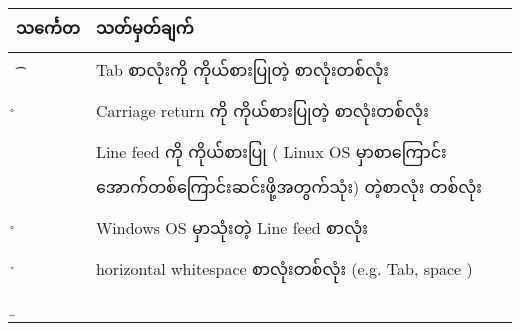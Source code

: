 \documentclass[11pt]{article}
\begin{document}
\begin{longtable}[c]{@{}ll@{}}
\toprule
\begin{minipage}[b]{0.17\columnwidth}\raggedright\strut
သင်္ကေတ
\strut\end{minipage} &
\begin{minipage}[b]{0.16\columnwidth}\raggedright\strut
သတ်မှတ်ချက်
\strut\end{minipage}\tabularnewline
\midrule
\endhead
\begin{minipage}[t]{0.17\columnwidth}\raggedright\strut
\t 
\strut\end{minipage} &
\begin{minipage}[t]{0.16\columnwidth}\raggedright\strut
Tab စာလုံးကို ကိုယ်စားပြုတဲ့ စာလုံးတစ်လုံး
\strut\end{minipage}\tabularnewline
\begin{minipage}[t]{0.17\columnwidth}\raggedright\strut
\r 
\strut\end{minipage} &
\begin{minipage}[t]{0.16\columnwidth}\raggedright\strut
Carriage return ကို ကိုယ်စားပြုတဲ့ စာလုံးတစ်လုံး
\strut\end{minipage}\tabularnewline
\begin{minipage}[t]{0.17\columnwidth}\raggedright\strut
\n 
\strut\end{minipage} &
\begin{minipage}[t]{0.16\columnwidth}\raggedright\strut
Line feed ကို ကိုယ်စားပြု ( Linux OS မှာစာကြောင်း
အောက်တစ်ကြောင်းဆင်းဖို့အတွက်သုံး) တဲ့စာလုံး တစ်လုံး
\strut\end{minipage}\tabularnewline
\begin{minipage}[t]{0.17\columnwidth}\raggedright\strut
\r\n 
\strut\end{minipage} &
\begin{minipage}[t]{0.16\columnwidth}\raggedright\strut
Windows OS မှာသုံးတဲ့ Line feed စာလုံး
\strut\end{minipage}\tabularnewline
\begin{minipage}[t]{0.17\columnwidth}\raggedright\strut
\h 
\strut\end{minipage} &
\begin{minipage}[t]{0.16\columnwidth}\raggedright\strut
horizontal whitespace စာလုံးတစ်လုံး (e.g. Tab, space )
\strut\end{minipage}\tabularnewline
\begin{minipage}[t]{0.17\columnwidth}\raggedright\strut
\b 
\strut\end{minipage} &
\begin{minipage}[t]{0.16\columnwidth}\raggedright\strut

\end{minipage}
\end{longtable}
\end{document}
